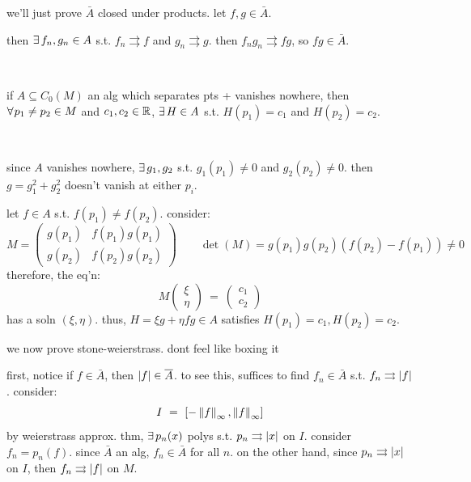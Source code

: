 \newpage
\begin{pf}[source=Primary Source Material]
	we'll just prove $\bar{A}$ closed under products. let $f,g\in\bar{A}$.

	then $\ex f_{n},g_{n}\in A$ s.t.
	$f_{n}\rightrightarrows f$ and $g_{n}\rightrightarrows g$.
	then $f_{n}g_{n}\rightrightarrows fg$, so $fg\in\bar{A}$.
\end{pf} \

\begin{lm}
	if $A\subseteq C_{0}(M)$ an alg which separates pts + vanishes nowhere,
	then $\fa p_{1}\neq p_{2}\in M$ and $c_{1},c_{2}\in\mathbb{R}$,
	$\ex H\in A$ s.t. $H(p_{1})=c_{1}$ and $H(p_{2})=c_{2}$.
\end{lm} \

\begin{pf}[source=Primary Source Material]
	since $A$ vanishes nowhere, $\ex g_{1},g_{2}$ s.t. $g_{1}(p_{1})\neq0$
	and $g_{2}(p_{2})\neq0$. then $g=g_{1}^{2}+g_{2}^{2}$ doesn't vanish at
	either $p_{i}$.

	let $f\in A$ s.t. $f(p_{1})\neq f(p_{2})$. consider:
	\begin{equation*}
		M =
		\begin{pmatrix}
			g(p_{1}) & f(p_{1})g(p_{1}) \\
			g(p_{2}) & f(p_{2})g(p_{2})
		\end{pmatrix} \qquad
		\det(M) = g(p_{1})g(p_{2})(f(p_{2})-f(p_{1})) \neq 0
	\end{equation*}
	therefore, the eq'n:
	\begin{equation*}
		M
		\begin{pmatrix}
			\xi \\ \eta
		\end{pmatrix}
		\ = \
		\begin{pmatrix}
			c_{1} \\ c_{2}
		\end{pmatrix}
	\end{equation*}
	has a soln $(\xi,\eta)$.
	thus, $H=\xi g+\eta fg\in A$ satisfies $H(p_{1})=c_{1},H(p_{2})=c_{2}$.
\end{pf}

we now prove stone-weierstrass. dont feel like boxing it

first, notice if $f\in\bar{A}$, then $\abs{f}\in\overline{A}$.
to see this, suffices to find $f_{n}\in\bar{A}$ s.t. $f_{n}\rightrightarrows\abs{f}$.
consider:
\begin{equation*}
	I \ = \ [-\norm{f}_{\infty},\norm{f}_{\infty}]
\end{equation*}
by weierstrass approx. thm, $\ex p_{n}(x)$ polys s.t. $p_{n}\rightrightarrows\abs{x}$ on $I$.
consider $f_{n}=p_{n}(f)$. since $\bar{A}$ an alg, $f_{n}\in\bar{A}$ for all $n$.
on the other hand, since $p_{n}\rightrightarrows\abs{x}$ on $I$, then
$f_{n}\rightrightarrows\abs{f}$ on $M$.

